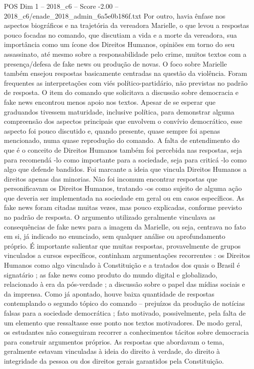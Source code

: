 \begin{textsample}{POS Dim 1 – 2018\_c6 – Score -2.00 – 2018\_c6/enade\_2018\_admin\_6a5e0b186f.txt}
Por outro, havia ênfase nos aspectos biográficos e na trajetória da vereadora Marielle, o que levou a respostas pouco focadas no comando, que discutiam a vida e a morte da vereadora, sua importância como um ícone dos Direitos Humanos, opiniões em torno do seu assassinato, até mesmo sobre a responsabilidade pelo crime, muitos textos com a presença/defesa de fake news ou produção de novas.
O foco sobre Marielle também ensejou respostas basicamente centradas na questão da violência.
Foram frequentes as interpretações com viés político-partidário, não previstas no padrão de resposta.
O item do comando que solicitava a discussão sobre democracia e fake news encontrou menos apoio nos textos.
Apesar de se esperar que graduandos tivessem maturidade, inclusive política, para demonstrar alguma compreensão dos aspectos principais que envolvem o convívio democrático, esse aspecto foi pouco discutido e, quando presente, quase sempre foi apenas mencionado, numa quase reprodução do comando.
A falta de entendimento do que é o conceito de Direitos Humanos também foi percebida nas respostas, seja para recomendá -lo como importante para a sociedade, seja para criticá -lo como algo que defende bandidos.
Foi marcante a ideia que vincula Direitos Humanos a direitos apenas das minorias.
Não foi incomum encontrar respostas que personificavam os Direitos Humanos, tratando -os como sujeito de alguma ação que deveria ser implementada na sociedade em geral ou em casos específicos.
As fake news foram citadas muitas vezes, mas pouco explicadas, conforme previsto no padrão de resposta.
O argumento utilizado geralmente vinculava as consequências de fake news para a imagem da Marielle, ou seja, centrava no fato em si, já indicado no enunciado, sem qualquer análise ou aprofundamento próprio.
É importante salientar que muitas respostas, provavelmente de grupos vinculados a cursos específicos, continham argumentações recorrentes : os Direitos Humanos como algo vinculado à Constituição e a tratados dos quais o Brasil é signatário ; as fake news como produto do mundo digital e globalizado, relacionado à era da pós-verdade ; a discussão sobre o papel das mídias sociais e da imprensa.
Como já apontado, houve baixa quantidade de respostas contemplando o segundo tópico do comando – prejuízos da produção de notícias falsas para a sociedade democrática ; fato motivado, possivelmente, pela falta de um elemento que ressaltasse esse ponto nos textos motivadores.
De modo geral, os estudantes não conseguiram recorrer a conhecimentos tácitos sobre democracia para construir argumentos próprios.
As respostas que abordavam o tema, geralmente estavam vinculadas à ideia do direito à verdade, do direito à integridade da pessoa ou dos direitos gerais garantidos pela Constituição.

\end{textsample}
